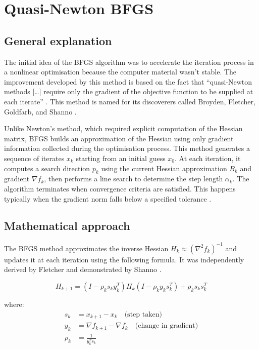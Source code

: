 \section{Quasi-Newton BFGS}

\subsection{General explanation}

The initial idea of the BFGS algorithm was to accelerate the iteration process in a nonlinear optimisation because the computer material wasn’t stable. The improvement developed by this method is based on the fact that “quasi-Newton methods […] require only the gradient of the objective function to be supplied at each iterate” \cite{nocedalwright1999}. This method is named for its discoverers called Broyden, Fletcher, Goldfarb, and Shanno \cite{nocedalwright1999}.

Unlike Newton’s method, which required explicit computation of the Hessian matrix, BFGS builds an approximation of the Hessian using only gradient information collected during the optimisation process. This method generates a sequence of iterates $x_k$ starting from an initial guess $x_0$. At each iteration, it computes a search direction $p_k$ using the current Hessian approximation $B_k$ and gradient $\nabla f_k$, then performs a line search to determine the step length $\alpha_k$. The algorithm terminates when convergence criteria are satisfied. This happens typically when the gradient norm falls below a specified tolerance \cite{nocedalwright1999}.

\subsection{Mathematical approach}

The BFGS method approximates the inverse Hessian $H_k \approx (\nabla^2 f_k)^{-1}$ and updates it at each iteration using the following formula. It was independently derived by Fletcher \cite{fletcher1970} and demonstrated by Shanno \cite{shanno1970}.

\begin{equation}
H_{k+1} = (I - \rho_k s_k y_k^T) H_k (I - \rho_k y_k s_k^T) + \rho_k s_k s_k^T
\end{equation}

where:
\begin{align*}
s_k &= x_{k+1} - x_k \quad \text{(step taken)} \\
y_k &= \nabla f_{k+1} - \nabla f_k \quad \text{(change in gradient)} \\
\rho_k &= \frac{1}{y_k^T s_k}
\end{align*}

